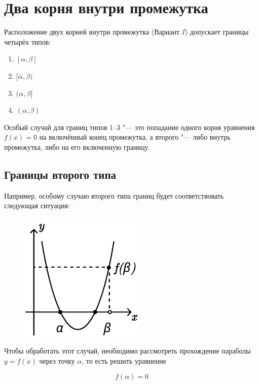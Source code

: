 \section {Два корня внутри промежутка}

Расположение двух корней внутри промежутка (Вариант $I$) допускает границы четырёх типов:

\begin {enumerate} [labelindent=\parindent, leftmargin=*]
    \item {$[\alpha, \beta]$}
    \item {$[\alpha, \beta)$}
    \item {$(\alpha, \beta]$}
    \item {$(\alpha, \beta)$}
\end {enumerate}

Особый случай для границ типов 1--3 "--- это попадание одного корня уравнения $f(x) = 0$ на
включённый конец промежутка, а второго "--- либо внутрь промежутка, либо на его включенную границу.

\subsection {Границы второго типа}

Например, особому случаю второго типа границ будет соответствовать следующая ситуация:

\begin {figure} [h]
    \begin {minipage} [t] {\linewidth}
        \centering
        \includegraphics [width=0.3\linewidth] {images/image_01.pdf}
    \end {minipage}
\end {figure}

Чтобы обработать этот случай, необходимо рассмотреть прохождение параболы $y = f(x)$ через точку
$\alpha$, то есть решить уравнение

\begin {equation*}
    f(\alpha) = 0
\end {equation*}

